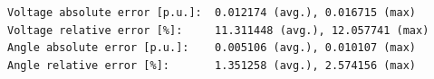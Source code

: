 \documentclass[10pt,letterpaper]{article}
\begin{document}
\begin{verbatim}
Voltage absolute error [p.u.]:  0.012174 (avg.), 0.016715 (max)
Voltage relative error [%]:     11.311448 (avg.), 12.057741 (max)
Angle absolute error [p.u.]:    0.005106 (avg.), 0.010107 (max)
Angle relative error [%]:       1.351258 (avg.), 2.574156 (max)

\end{verbatim}

\def\octavedatam{data/data_8_voltagem.data}
\def\octavedataa{data/data_8_voltagea.data}







\end{document}
